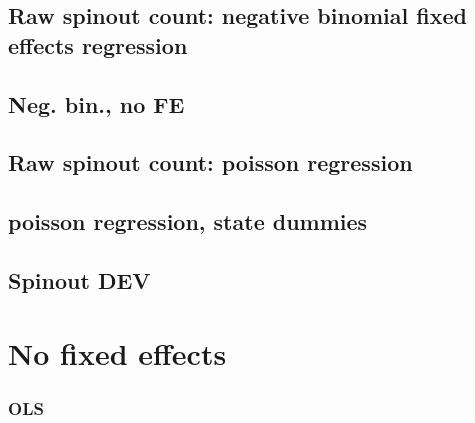 \documentclass[12pt,english]{article}
\theoremstyle{remark}
\begin{document}
\subsection{Raw spinout count: negative binomial fixed effects regression}


\linebreak

\subsection{Neg. bin., no FE}


\linebreak

\subsection{Raw spinout count: poisson regression}


\linebreak

\subsection{poisson regression, state dummies}


\linebreak

\subsection{Spinout DEV}


\linebreak


\section{No fixed effects}



\subsubsection{OLS}

\linebreak

\linebreak

\linebreak

\linebreak

\linebreak

\linebreak

\linebreak

\linebreak

\linebreak

\end{document}
